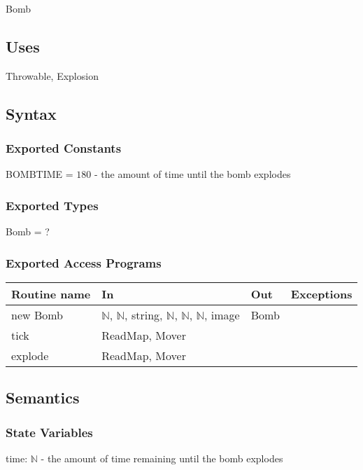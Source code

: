 \documentclass[12pt]{article}
\begin{document}
Bomb

\subsection*{Uses}

Throwable, Explosion

\subsection*{Syntax}

\subsubsection*{Exported Constants}

BOMBTIME = $180$ - the amount of time until the bomb explodes

\subsubsection*{Exported Types}

Bomb = ?

\subsubsection*{Exported Access Programs}

\begin{tabular}{| l | l | l | l |}
\hline
\textbf{Routine name} & \textbf{In} & \textbf{Out} & \textbf{Exceptions}\\
\hline
new Bomb & $\mathbb{N}$, $\mathbb{N}$, string, $\mathbb{N}$, $\mathbb{N}$, $\mathbb{N}$, image & Bomb & ~\\
\hline
tick & ReadMap, Mover & ~ & ~\\
\hline
explode & ReadMap, Mover & ~ & ~\\
\hline
\end{tabular}

\subsection*{Semantics}

\subsubsection*{State Variables}

time: $\mathbb{N}$ - the amount of time remaining until the bomb explodes
\end{document}
